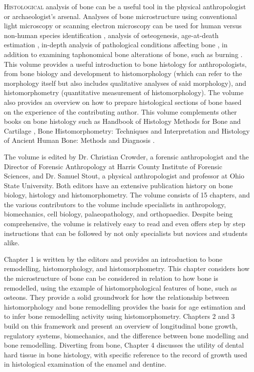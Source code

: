 \documentclass[%
	]{ijsra}
\begin{document}
\IJSRAopening%
\lettrine{H}{istological} analysis of bone can be a useful tool in the physical anthropologist or archaeologist’s arsenal. Analyses of bone microstructure using conventional light microscopy or scanning electron microscopy can be used for human versus non-human species identification \parencite{Hillier2007}, analysis of osteogenesis, age-at-death estimation \parencite{Crowder2005}, in-depth analysis of pathological conditions affecting bone \parencite{DeBoer2016}, in addition to examining taphonomical bone alterations of bone, such as burning \parencite{Horocholyn2013,Hollund2012}. This volume provides a useful introduction to bone histology for anthropologists, from bone biology and development to histomorphology (which can refer to the morphology itself but also includes qualitative analyses of said morphology), and histomorphometry (quantitative measurement of histomorphology). The volume also provides an overview on how to prepare histological sections of bone based on the experience of the contributing author. This volume complements other books on bone histology such as Handbook of Histology Methods for Bone and Cartilage \parencite{An2003}, Bone Histomorphometry: Techniques and Interpretation \parencite{Recker1983} and Histology of Ancient Human Bone: Methods and Diagnosis \parencite{Grupe2012}.

The volume is edited by Dr. Christian Crowder, a forensic anthropologist and the Director of Forensic Anthropology at Harris County Institute of Forensic Sciences, and Dr. Samuel Stout, a physical anthropologist and professor at Ohio State University. Both editors have an extensive publication history on bone biology, histology and histomorphometry. The volume consists of 15 chapters, and the various contributors to the volume include specialists in anthropology, biomechanics, cell biology, palaeopathology, and orthopaedics. Despite being comprehensive, the volume is relatively easy to read and even offers step by step instructions that can be followed by not only specialists but novices and students alike.

Chapter 1 is written by the editors and provides an introduction to bone remodelling, histomorphology, and histomorphometry. This chapter considers how the microstructure of bone can be considered in relation to how bone is remodelled, using the example of histomorphological features of bone, such as osteons. They provide a solid groundwork for how the relationship between histomorphology and bone remodelling provides the basis for age estimation and to infer bone remodelling activity using histomorphometry. Chapters 2 and 3 build on this framework and present an overview of longitudinal bone growth, regulatory systems, biomechanics, and the difference between bone modelling and bone remodelling. Diverting from bone, Chapter 4 discusses the utility of dental hard tissue in bone histology, with specific reference to the record of growth used in histological examination of the enamel and dentine.
\end{document}
